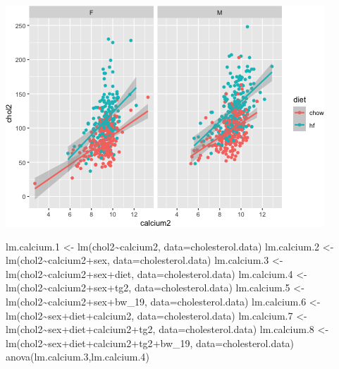 \documentclass[
]{article}
\newenvironment{Shaded}{\begin{snugshade}}{\end{snugshade}}
\newcommand{\AttributeTok}[1]{\textcolor[rgb]{0.77,0.63,0.00}{#1}}
\newcommand{\FloatTok}[1]{\textcolor[rgb]{0.00,0.00,0.81}{#1}}
\newcommand{\FunctionTok}[1]{\textcolor[rgb]{0.00,0.00,0.00}{#1}}
\newcommand{\NormalTok}[1]{#1}
\newcommand{\OtherTok}[1]{\textcolor[rgb]{0.56,0.35,0.01}{#1}}
\newcommand{\SpecialCharTok}[1]{\textcolor[rgb]{0.00,0.00,0.00}{#1}}
\begin{document}
\includegraphics{figures/Calcium-1.png}

\begin{Shaded}
\begin{Highlighting}[]
\NormalTok{lm.calcium}\FloatTok{.1} \OtherTok{\textless{}{-}} \FunctionTok{lm}\NormalTok{(chol2}\SpecialCharTok{\textasciitilde{}}\NormalTok{calcium2, }\AttributeTok{data=}\NormalTok{cholesterol.data)}
\NormalTok{lm.calcium}\FloatTok{.2} \OtherTok{\textless{}{-}} \FunctionTok{lm}\NormalTok{(chol2}\SpecialCharTok{\textasciitilde{}}\NormalTok{calcium2}\SpecialCharTok{+}\NormalTok{sex, }\AttributeTok{data=}\NormalTok{cholesterol.data)}
\NormalTok{lm.calcium}\FloatTok{.3} \OtherTok{\textless{}{-}} \FunctionTok{lm}\NormalTok{(chol2}\SpecialCharTok{\textasciitilde{}}\NormalTok{calcium2}\SpecialCharTok{+}\NormalTok{sex}\SpecialCharTok{+}\NormalTok{diet, }\AttributeTok{data=}\NormalTok{cholesterol.data)}
\NormalTok{lm.calcium}\FloatTok{.4} \OtherTok{\textless{}{-}} \FunctionTok{lm}\NormalTok{(chol2}\SpecialCharTok{\textasciitilde{}}\NormalTok{calcium2}\SpecialCharTok{+}\NormalTok{sex}\SpecialCharTok{+}\NormalTok{tg2, }\AttributeTok{data=}\NormalTok{cholesterol.data)}
\NormalTok{lm.calcium}\FloatTok{.5} \OtherTok{\textless{}{-}} \FunctionTok{lm}\NormalTok{(chol2}\SpecialCharTok{\textasciitilde{}}\NormalTok{calcium2}\SpecialCharTok{+}\NormalTok{sex}\SpecialCharTok{+}\NormalTok{bw\_19, }\AttributeTok{data=}\NormalTok{cholesterol.data)}
\NormalTok{lm.calcium}\FloatTok{.6} \OtherTok{\textless{}{-}} \FunctionTok{lm}\NormalTok{(chol2}\SpecialCharTok{\textasciitilde{}}\NormalTok{sex}\SpecialCharTok{+}\NormalTok{diet}\SpecialCharTok{+}\NormalTok{calcium2, }\AttributeTok{data=}\NormalTok{cholesterol.data)}
\NormalTok{lm.calcium}\FloatTok{.7} \OtherTok{\textless{}{-}} \FunctionTok{lm}\NormalTok{(chol2}\SpecialCharTok{\textasciitilde{}}\NormalTok{sex}\SpecialCharTok{+}\NormalTok{diet}\SpecialCharTok{+}\NormalTok{calcium2}\SpecialCharTok{+}\NormalTok{tg2, }\AttributeTok{data=}\NormalTok{cholesterol.data)}
\NormalTok{lm.calcium}\FloatTok{.8} \OtherTok{\textless{}{-}} \FunctionTok{lm}\NormalTok{(chol2}\SpecialCharTok{\textasciitilde{}}\NormalTok{sex}\SpecialCharTok{+}\NormalTok{diet}\SpecialCharTok{+}\NormalTok{calcium2}\SpecialCharTok{+}\NormalTok{tg2}\SpecialCharTok{+}\NormalTok{bw\_19, }\AttributeTok{data=}\NormalTok{cholesterol.data)}
\FunctionTok{anova}\NormalTok{(lm.calcium}\FloatTok{.3}\NormalTok{,lm.calcium}\FloatTok{.4}\NormalTok{)}
\end{Highlighting}
\end{Shaded}
\end{document}
